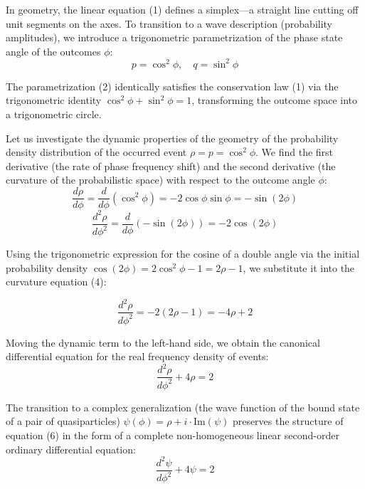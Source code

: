 \documentclass{article}
\begin{document}
In geometry, the linear equation (1) defines a simplex—a straight line cutting off unit segments on the axes. To transition to a wave description (probability amplitudes), we introduce a trigonometric parametrization of the phase state angle of the outcomes $\phi$:
\begin{equation}
p = \cos^2 \phi, \quad q = \sin^2 \phi
\end{equation}

The parametrization (2) identically satisfies the conservation law (1) via the trigonometric identity $\cos^2 \phi + \sin^2 \phi = 1$, transforming the outcome space into a trigonometric circle.

Let us investigate the dynamic properties of the geometry of the probability density distribution of the occurred event $\rho = p = \cos^2 \phi$. We find the first derivative (the rate of phase frequency shift) and the second derivative (the curvature of the probabilistic space) with respect to the outcome angle $\phi$:
\begin{equation}
\frac{d\rho}{d\phi} = \frac{d}{d\phi}(\cos^2 \phi) = -2 \cos \phi \sin \phi = -\sin(2\phi)
\end{equation}
\begin{equation}
\frac{d^2\rho}{d\phi^2} = \frac{d}{d\phi}(-\sin(2\phi)) = -2 \cos(2\phi)
\end{equation}

Using the trigonometric expression for the cosine of a double angle via the initial probability density $\cos(2\phi) = 2 \cos^2 \phi - 1 = 2\rho - 1$, we substitute it into the curvature equation (4):

\vspace{0.5cm}
\begin{equation}
\frac{d^2\rho}{d\phi^2} = -2(2\rho - 1) = -4\rho + 2
\end{equation}

Moving the dynamic term to the left-hand side, we obtain the canonical differential equation for the real frequency density of events:
\begin{equation}
\frac{d^2\rho}{d\phi^2} + 4\rho = 2
\end{equation}

The transition to a complex generalization (the wave function of the bound state of a pair of quasiparticles) $\psi(\phi) = \rho + i \cdot \text{Im}(\psi)$ preserves the structure of equation (6) in the form of a complete non-homogeneous linear second-order ordinary differential equation:
\begin{equation}
\frac{d^2\psi}{d\phi^2} + 4\psi = 2
\end{equation}
\end{document}
